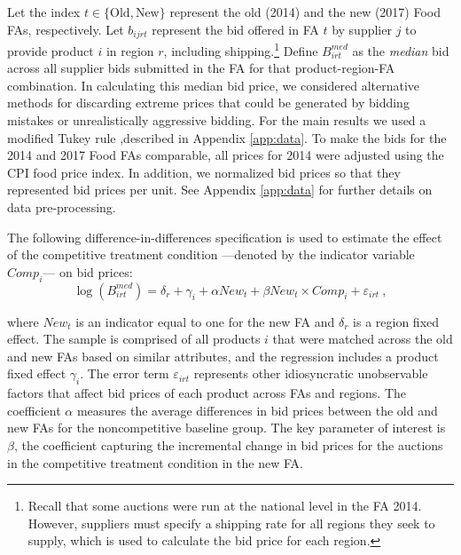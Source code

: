 Let the index $t\in\{\text{Old},\text{New}\}$ represent the old (2014) and the new (2017) Food FAs, respectively.  Let $b_{ijrt}$ represent the bid offered in FA $t$ by supplier $j$ to provide product $i$ in region $r$, including shipping.\footnote{Recall that some auctions were run at the national level in  the FA 2014. However, suppliers must specify a shipping rate for all regions they seek to supply, which is used to calculate the bid price for each region.} Define $B^{med}_{irt}$ as the \textit{median} bid across all supplier bids submitted in the FA for that product-region-FA combination. In calculating this median bid price, we considered alternative methods for discarding extreme prices that could be generated by bidding mistakes or unrealistically aggressive bidding. For the main results we used a modified Tukey rule \citep{Tukey1977},described in Appendix \ref{app:data}. To make the bids for the 2014 and 2017 Food FAs comparable, all prices for 2014 were adjusted using the CPI food price index. In addition, we normalized bid prices so that they represented bid prices per unit. See  Appendix \ref{app:data} for further details on data pre-processing. 

The following difference-in-differences specification is used to estimate the effect of the competitive treatment condition ---denoted by the indicator variable $Comp_{i}$--- on bid prices:
\begin{equation}
    \log (B^{med}_{irt}) = \delta_r + \gamma_i + \alpha New_{t} + \beta New_{t}\times Comp_{i} + \varepsilon_{irt} \ ,
    \label{eq:reg_sub_bid}
\end{equation}

\noindent where $New_t$ is an indicator equal to one for the new FA and $\delta_r$ is a region fixed effect. The sample is comprised of all products $i$ that were matched across the old and new FAs based on similar attributes, and the regression includes a product fixed effect $\gamma_i$. {The error term $\varepsilon_{irt}$ represents other idiosyncratic unobservable factors that affect bid prices of each product across FAs and  regions.} The coefficient $\alpha$ measures the average differences in bid prices between the old and new FAs for the noncompetitive baseline group. The key parameter of interest is $\beta$, the coefficient capturing the incremental change in bid prices for the auctions in the competitive treatment condition in the new FA.

